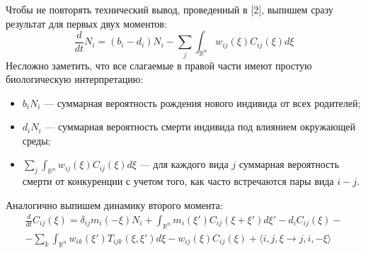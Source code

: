 Чтобы не повторять технический вывод, проведенный в [2], выпишем сразу результат для первых двух моментов:
\begin{equation*}
\frac{d}{dt}N_{i}=(b_{i}-d_{i})N_{i}-\sum_{j}\int_{\mathbb{R}^{n}}w_{ij}(\xi)C_{ij}(\xi)d\xi
\end{equation*}
Несложно заметить, что все слагаемые в правой части имеют простую биологическую интерпретацию:
\begin{itemize}
\item $ b_{i}N_{i} $ --- суммарная вероятность рождения нового индивида от всех родителей;

\item $ d_{i}N_{i} $ --- суммарная вероятность смерти индивида под влиянием окружающей среды;

\item $ \sum_{j}\int_{\mathbb{R}^{n}}w_{ij}(\xi)C_{ij}(\xi)d\xi $ --- для каждого вида $ j $ суммарная вероятность смерти от конкуренции с учетом того, как часто встречаются пары вида $ i-j $.
\end{itemize}
Аналогично выпишем динамику второго момента:
\begin{multline*}
\frac{d}{dt}C_{ij}(\xi)	=	\delta_{ij}m_{i}(-\xi)N_{i}+\int_{\mathbb{\mathbb{R}}^{n}}m_{i}(\xi')C_{ij}(\xi+\xi')d\xi'-d_{i}C_{ij}(\xi)-\\
-\sum_{k}\int_{\mathbb{\mathbb{R}}^{n}}w_{ik}(\xi')T_{ijk}(\xi,\xi')d\xi-w_{ij}(\xi)C_{ij}(\xi)+\langle i,j,\xi\to j,i,-\xi\rangle
\end{multline*}

